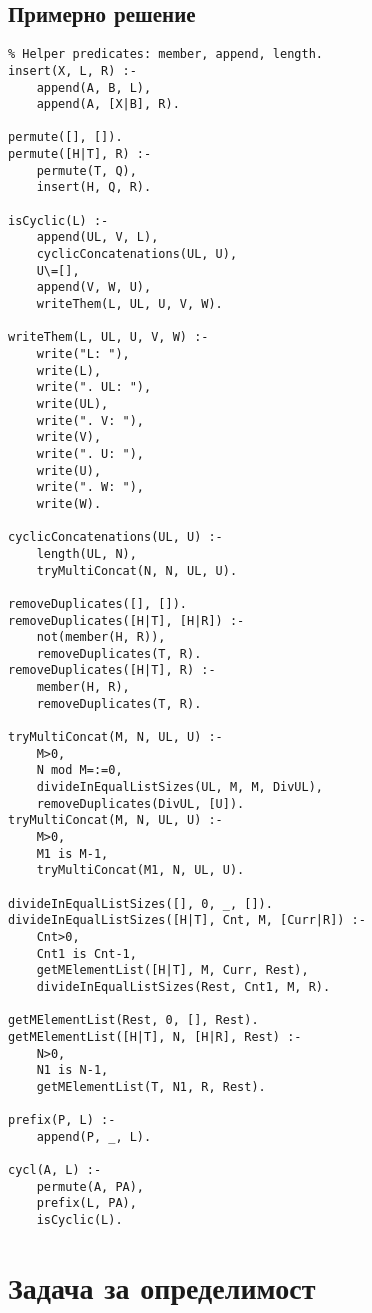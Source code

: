 \documentclass[12pt]{article}
\newenvironment{longlisting}{\captionsetup{type=listing}}{}
\begin{document}
\subsection{Примерно решение} 
\begin{longlisting}
\begin{verbatim}
% Helper predicates: member, append, length.
insert(X, L, R) :-
    append(A, B, L),
    append(A, [X|B], R).

permute([], []).
permute([H|T], R) :-
    permute(T, Q),
    insert(H, Q, R).

isCyclic(L) :-
    append(UL, V, L),
    cyclicConcatenations(UL, U),
    U\=[],
    append(V, W, U),
    writeThem(L, UL, U, V, W).

writeThem(L, UL, U, V, W) :-
    write("L: "),
    write(L),
    write(". UL: "),
    write(UL),
    write(". V: "),
    write(V),
    write(". U: "),
    write(U),
    write(". W: "),
    write(W).

cyclicConcatenations(UL, U) :-
    length(UL, N),
    tryMultiConcat(N, N, UL, U).

removeDuplicates([], []).
removeDuplicates([H|T], [H|R]) :-
    not(member(H, R)),
    removeDuplicates(T, R).
removeDuplicates([H|T], R) :-
    member(H, R),
    removeDuplicates(T, R).

tryMultiConcat(M, N, UL, U) :-
    M>0,
    N mod M=:=0,
    divideInEqualListSizes(UL, M, M, DivUL),
    removeDuplicates(DivUL, [U]).
tryMultiConcat(M, N, UL, U) :-
    M>0,
    M1 is M-1,
    tryMultiConcat(M1, N, UL, U).

divideInEqualListSizes([], 0, _, []).
divideInEqualListSizes([H|T], Cnt, M, [Curr|R]) :-
    Cnt>0,
    Cnt1 is Cnt-1,
    getMElementList([H|T], M, Curr, Rest),
    divideInEqualListSizes(Rest, Cnt1, M, R).

getMElementList(Rest, 0, [], Rest).
getMElementList([H|T], N, [H|R], Rest) :-
    N>0,
    N1 is N-1,
    getMElementList(T, N1, R, Rest).

prefix(P, L) :-
    append(P, _, L).

cycl(A, L) :-
    permute(A, PA),
    prefix(L, PA),
    isCyclic(L).
\end{verbatim}
\end{longlisting}

\newpage
\section{Задача за определимост}
\end{document}
